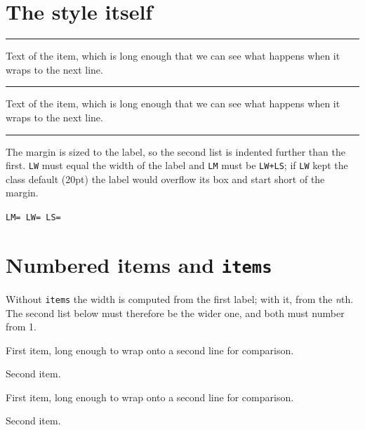 \documentclass{article}
\newcommand\dims{\texttt{LM=\the\leftmargin\ LW=\the\labelwidth\
  LS=\the\labelsep}}
\begin{document}
\section{The style itself}

\noindent\rule{\textwidth}{0.3pt}
\begin{prop}[name=Name of the item, style=fitmargin]
  \item Text of the item, which is long enough that we can see what happens
  when it wraps to the next line.
\end{prop}
\noindent\rule{\textwidth}{0.3pt}
\begin{prop}[name=A considerably longer name for the item, style=fitmargin]
  \item Text of the item, which is long enough that we can see what happens
  when it wraps to the next line.
\end{prop}
\noindent\rule{\textwidth}{0.3pt}

The margin is sized to the label, so the second list is indented further than
the first.  \texttt{LW} must equal the width of the label and \texttt{LM} must
be \texttt{LW+LS}; if \texttt{LW} kept the class default (20pt) the label would
overflow its box and start short of the margin.

\begin{prop}[name=Short, style=fitmargin]
  \item \dims
\end{prop}

\section{Numbered items and \texttt{items}}

Without \texttt{items} the width is computed from the first label; with it,
from the \textit{n}th.  The second list below must therefore be the wider one,
and both must number from 1.

\begin{prop}[style=fitmargin]
  \item First item, long enough to wrap onto a second line for comparison.
  \item Second item. \label{h:a}
\end{prop}

\begin{prop}[style=fitmargin, items=20]
  \item First item, long enough to wrap onto a second line for comparison.
  \item Second item. \label{h:b}
\end{prop}
\end{document}
